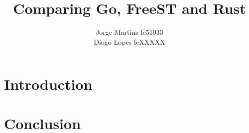 \documentclass[10pt, a4paper, twocolumn]{article}
\title{Comparing Go, FreeST and Rust\\
}
\author{Jorge Martins  fc51033\\
Diogo Lopes fcXXXXX}
\date{}
\begin{document}
\nocite{*}
\maketitle
\thispagestyle{empty}
\begin{abstract}
\lipsum[1]
\end{abstract}
\section{Introduction}
\lipsum
\section{Conclusion}
\lipsum


\end{document}
